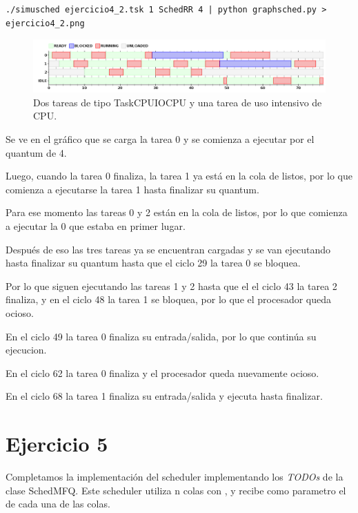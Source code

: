 \begin{framed}
\begin{verbatim}
./simusched ejercicio4_2.tsk 1 SchedRR 4 | python graphsched.py > ejercicio4_2.png
\end{verbatim}
\end{framed}

\begin{figure}[h!]
  \caption{Dos tareas de tipo TaskCPUIOCPU y una tarea de uso intensivo de CPU.}
  \centering
    \includegraphics[width=1\textwidth]{img/ejercicio4_2.png}
\end{figure}

Se ve en el gr\'afico que se carga la tarea 0 y se comienza a ejecutar por el quantum de 4.

Luego, cuando la tarea 0 finaliza, la tarea 1 ya est\'a en la cola de listos, por lo que comienza a ejecutarse la tarea 1 hasta finalizar su quantum.

Para ese momento las tareas 0 y 2 est\'an en la cola de listos, por lo que comienza a ejecutar la 0 que estaba en primer lugar.

Despu\'es de eso las tres tareas ya se encuentran cargadas y se van ejecutando hasta finalizar su quantum hasta que el ciclo 29 la tarea 0 se bloquea.

Por lo que siguen ejecutando las tareas 1 y 2 hasta que el el ciclo 43 la tarea 2 finaliza, y en el ciclo 48 la tarea 1 se bloquea, por lo que el procesador queda ocioso.

En el ciclo 49 la tarea 0 finaliza su entrada/salida, por lo que contin\'ua su ejecucion. 

En el ciclo 62 la tarea 0 finaliza y el procesador queda nuevamente ocioso.

En el ciclo 68 la tarea 1 finaliza su entrada/salida y ejecuta hasta finalizar.


\section{Ejercicio 5}

Completamos la implementaci\'on del scheduler \mfq implementando los \textit{TODOs} de la clase SchedMFQ. Este scheduler utiliza n colas con \rr, y recibe como parametro el \quantum de cada una de las colas.

